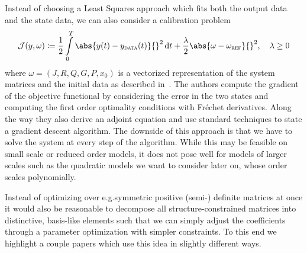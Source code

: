
Instead of choosing a Least Squares approach which fits both the output data and the state data, we can also consider a calibration problem
\begin{equation}
    \mcl{J}(y, \omega) \coloneqq \frac{1}{2} \int\limits_0^T \abs{y(t) - y_\msc{data}(t)}{}^2 \dif t + \frac{\lambda}{2} \abs{\omega - \omega_\msc{ref}}{}^2, \quad \lambda \geq 0
\end{equation}
where $\omega = (J, R, Q, G, P, x_0)$ is a vectorized representation of the system matrices and the initial data as described in~\cite{Günther2023}.
The authors compute the gradient of the objective functional by considering the error in the two states and computing the first order optimality conditions with Fréchet derivatives.
Along the way they also derive an adjoint equation and use standard techniques to state a gradient descent algorithm.
The downside of this approach is that we have to solve the system at every step of the algorithm.
While this may be feasible on small scale or reduced order models, it does not pose well for models of larger scales such as the quadratic models we want to consider later on, whose order scales polynomially.


Instead of optimizing over e.\@ g.\@ symmetric positive (semi-) definite matrices at once it would also be reasonable to decompose all structure-constrained matrices into distinctive, basis-like elements such that we can simply adjust the coefficients through a parameter optimization with simpler constraints.
To this end we highlight a couple papers which use this idea in slightly different ways.

